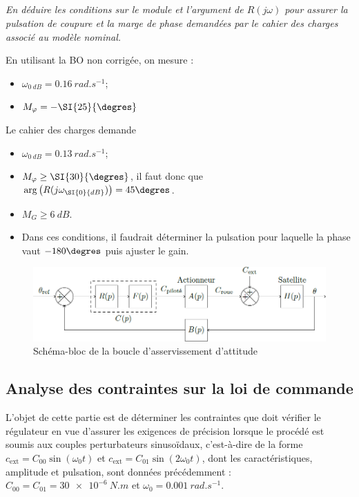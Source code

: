 \subparagraph{\label{q_17}}\textit{En déduire les conditions sur le module et l’argument de $R(j\omega)$ pour assurer la pulsation de coupure et
la marge de phase demandées par le cahier des charges associé au modèle nominal.}
\ifprof
\begin{corrige}
En utilisant la BO non corrigée, on mesure :
\begin{itemize}
\item $\omega_{\SI{0}{dB}} = \SI{0,16}{rad.s^{-1}}$;
\item $M_{\varphi}=-\SI{25}{\degres}$
\end{itemize}
Le cahier des charges demande 
\begin{itemize}
\item $\omega_{\SI{0}{dB}} = \SI{0,13}{rad.s^{-1}}$;
\item $M_{\varphi}\geq \SI{30}{\degres}$, il faut donc que $\arg\left(R(j\omega_{\SI{0}{dB}}) \right)=45\degres$.
\item $M_{G}\geq \SI{6}{dB}$.
\item Dans ces conditions, il faudrait déterminer la pulsation pour laquelle la phase vaut $-180\degres$ puis ajuster le gain.
\end{itemize}
\end{corrige}
\else
\fi


\ifprof
\else

\begin{figure}[H]
\centering
\includegraphics[width=.8\linewidth]{images/fig_11}
\caption{Schéma-bloc de la boucle d’asservissement d’attitude \label{fig_11}}
\end{figure}

\fi




\subsection{\label{sec:3:B} Analyse des contraintes sur la loi de commande}

\ifprof
\else

L’objet de cette partie est de déterminer les contraintes que doit vérifier le régulateur en vue d’assurer les
exigences de précision lorsque le procédé est soumis aux couples perturbateurs sinusoïdaux, c’est-à-dire de la
forme 
$c_{\text{ext}} = C_{00}\sin(\omega_0 t)$ et 
$c_{\text{ext}} = C_{01} \sin(2\omega_0t)$, 
dont les caractéristiques, amplitude et pulsation, sont données
précédemment : $C_{00} = C_{01} = \SI{30e-6}{N.m}$  et $\omega_0 = \SI{0,001}{rad.s^{-1}}$.
\fi


